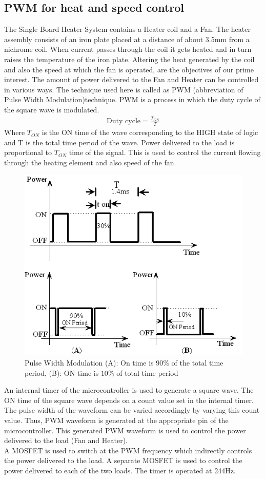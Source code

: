 \documentclass[12pt]{report}
\begin{document}
\subsection{PWM for heat and speed control}
The Single Board Heater System contains a Heater coil and a Fan. The heater assembly consists of an iron plate placed at a distance of about 3.5mm from a nichrome coil. When current passes through the coil it gets heated and in turn raises the temperature of the iron plate. Altering the heat generated by the coil and also the speed at which the fan is operated, are the objectives of our prime interest.
The amount of power delivered to the Fan and Heater can be controlled in various ways. The technique used here is called as PWM (abbreviation of Pulse Width Modulation)technique.
PWM is a process in which the duty cycle of the square wave is modulated.
\begin{align}
      \text{Duty cycle} = \frac{T_{ON}}{T}
\end{align}
Where $T_{ON}$ is the ON time of the wave corresponding to the HIGH state of logic and T is the total time period of the wave. Power delivered to the load is proportional to $T_{ON}$ time of the signal. This is used to control the current flowing through the heating element and also speed of the fan.
\begin{figure}
\centering
\includegraphics[width=0.5\linewidth]{pwm}
\caption{Pulse Width Modulation (A): On time is $90\%$ of the total time period,    (B): ON time is $10\%$ of total time period}
\end{figure} 
An internal timer of the microcontroller is used to generate a square wave. The ON time of the square wave depends on a count value set in the internal timer. The pulse width of the waveform can be varied accordingly by varying this count value. Thus, PWM waveform is generated at the appropriate pin of the microcontroller. This generated PWM waveform is used to control the power delivered to the load (Fan and Heater). \\ A MOSFET is used to switch at the PWM frequency which indirectly controls the power delivered to the load. A separate MOSFET is used to control the power delivered to each of the two loads. The timer is operated at 244Hz.
\end{document}
